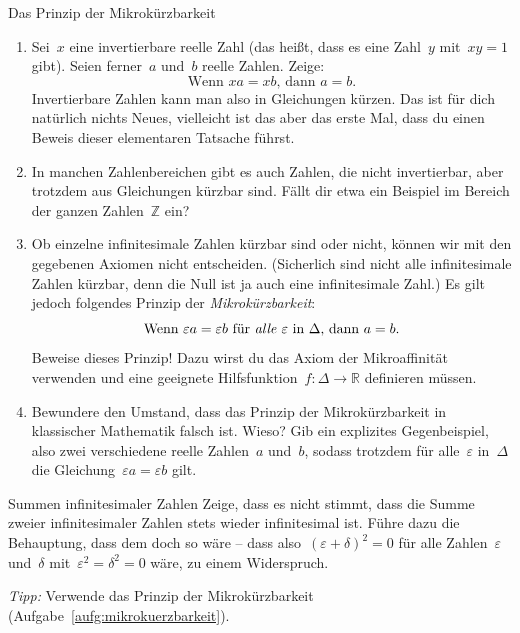 \documentclass[twoside]{../zirkelblatt}
\newcommand{\ZZ}{\mathbb{Z}}
\newcommand{\RR}{\mathbb{R}}
\theoremstyle{definition}
\theoremstyle{plain}
\theoremstyle{remark}
\begin{document}
\begin{aufgabeShaded}{Das Prinzip der Mikrokürzbarkeit}
\label{aufg:mikrokuerzbarkeit}
\begin{enumerate}
\item Sei~$x$ eine invertierbare reelle Zahl (das heißt, dass es eine Zahl~$y$
mit~$xy = 1$ gibt). Seien ferner~$a$ und~$b$ reelle Zahlen. Zeige:
\[ \text{Wenn $xa = xb$, dann $a = b$.} \]
Invertierbare Zahlen kann man also in Gleichungen kürzen. Das ist für dich
natürlich nichts Neues, vielleicht ist das aber das erste Mal, dass du einen
Beweis dieser elementaren Tatsache führst.

\item In manchen Zahlenbereichen gibt es auch Zahlen, die nicht invertierbar,
aber trotzdem aus Gleichungen kürzbar sind. Fällt dir etwa ein Beispiel im
Bereich der ganzen Zahlen~$\ZZ$ ein?

\item Ob einzelne infinitesimale Zahlen kürzbar sind oder nicht, können wir mit
den gegebenen Axiomen nicht entscheiden. (Sicherlich sind nicht alle
infinitesimale Zahlen kürzbar, denn die Null ist ja auch eine infinitesimale
Zahl.) Es gilt jedoch folgendes Prinzip der \emph{Mikrokürzbarkeit}:
\[ \text{Wenn~$\varepsilon a = \varepsilon b$ für \emph{alle} $\varepsilon$
in~$\Delta$, dann $a = b$.} \]
Beweise dieses Prinzip! Dazu wirst du das Axiom der Mikroaffinität verwenden
und eine geeignete Hilfsfunktion~$f : \Delta \to \RR$ definieren müssen.
\item Bewundere den Umstand, dass das Prinzip der Mikrokürzbarkeit in
klassischer Mathematik falsch ist. Wieso? Gib ein explizites Gegenbeispiel,
also zwei verschiedene reelle Zahlen~$a$ und~$b$, sodass trotzdem für
alle~$\varepsilon$ in~$\Delta$ die Gleichung~$\varepsilon a = \varepsilon b$
gilt.
\end{enumerate}
\end{aufgabeShaded}

\newpage
\begin{aufgabeShaded}{Summen infinitesimaler Zahlen}
Zeige, dass es nicht stimmt, dass die Summe zweier infinitesimaler Zahlen
stets wieder infinitesimal ist. Führe dazu die Behauptung, dass dem doch so wäre --
dass also~$(\varepsilon + \delta)^2 = 0$ für alle Zahlen~$\varepsilon$
und~$\delta$ mit~$\varepsilon^2 = \delta^2 = 0$ wäre, zu einem Widerspruch.

\emph{Tipp:} Verwende das Prinzip der Mikrokürzbarkeit
(Aufgabe~\ref{aufg:mikrokuerzbarkeit}).
\end{aufgabeShaded}
\end{document}
